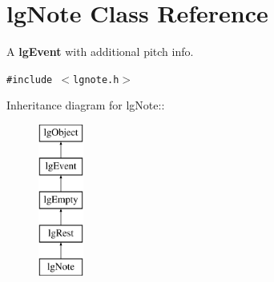 \section{lg\-Note Class Reference}
\label{classlgNote}
A {\bf lg\-Event} with additional pitch info.  


{\tt \#include $<$lgnote.h$>$}

Inheritance diagram for lg\-Note::\begin{figure}[H]
\begin{center}
\leavevmode
\includegraphics[height=5cm]{classlgNote}
\end{center}
\end{figure}
